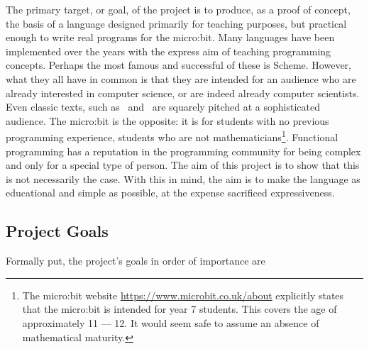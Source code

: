 \documentclass[12pt, a4paper]{report}
\begin{document}
The primary target, or goal, of the project is to produce, as a proof of concept, the basis of a
language designed primarily for teaching purposes, but practical enough to write real programs for
the micro:bit. Many languages have been implemented over the years with the express aim of teaching
programming concepts. Perhaps the most famous and successful of these is Scheme. However, what they
all have in common is that they are intended for an audience who are already interested in computer
science, or are indeed already computer scientists. Even classic texts, such
as~\cite{Abelson:1996:SIC:547755} and~\cite{Friedman1900} are squarely pitched at a sophisticated audience.
The micro:bit is the opposite: it is for students with no previous programming experience,
students who are not mathematicians\footnote{The micro:bit website \url{https://www.microbit.co.uk/about} explicitly states
that the micro:bit is intended for year 7 students. This covers the age of approximately 11 --- 12. It
would seem safe to assume an absence of mathematical maturity.}.
Functional programming has a reputation in the programming community for being complex and only for a
special type of person. The aim of this project is to show that this is not necessarily the case.
With this in mind, the aim is to make the language as educational and simple as possible, at the expense 
sacrificed expressiveness. 

\subsection{Project Goals}
Formally put, the project's goals in order of importance are 
\end{document}
